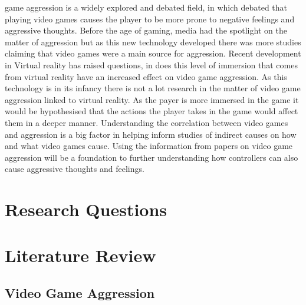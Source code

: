 \documentclass[journal]{IEEEtran}
\begin{document}
game aggression is a widely explored and debated field, in which debated that playing video games causes the player to be more prone to negative feelings and aggressive thoughts. Before the age of gaming, media had the spotlight on the matter of aggression but as this new technology developed there was more studies claiming that video games were a main source for aggression. Recent development in Virtual reality has raised questions, in does this level of immersion that comes from virtual reality have an increased effect on video game aggression. As this technology is in its infancy there is not a lot research in the matter of video game aggression linked to virtual reality. As the payer is more immersed in the game it would be hypothesised that the actions the player takes in the game would affect them in a deeper manner.
Understanding the correlation between video games and aggression is a big factor in helping inform studies of indirect causes on how and what video games cause. Using the information from papers on video game aggression will be a foundation to further understanding how controllers can also cause aggressive thoughts and feelings.




\section{Research Questions}

\section{Literature Review}

    \subsection{Video Game Aggression}
   
\end{document}
